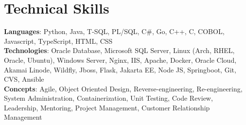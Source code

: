 \section{Technical Skills}
    \begin{itemize}[leftmargin=0.15in, label={}]
	\small{\item{
		\textbf{Languages}{: Python, Java, T-SQL, PL/SQL, C\#, Go, C++, C, COBOL, Javascript, TypeScript, HTML, CSS} \\
		\textbf{Technologies}{: Oracle Database, Microsoft SQL Server, Linux (Arch, RHEL, Oracle, Ubuntu), Windows Server, Nginx, IIS, Apache, Docker, Oracle Cloud, Akamai Linode, Wildfly, Jboss, Flask, Jakarta EE, Node JS, Springboot, Git, CVS, Ansible} \\
		\textbf{Concepts}{: Agile, Object Oriented Design, Reverse-engineering, Re-engineering, System Administration, Containerization, Unit Testing, Code Review, Leadership, Mentoring, Project Management, Customer Relationship Management}
	}}
    \end{itemize}